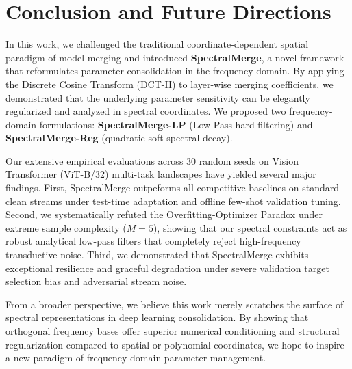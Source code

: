\section{Conclusion and Future Directions}
\label{sec:conclusion}

In this work, we challenged the traditional coordinate-dependent spatial paradigm of model merging and introduced \textbf{SpectralMerge}, a novel framework that reformulates parameter consolidation in the frequency domain. By applying the Discrete Cosine Transform (DCT-II) to layer-wise merging coefficients, we demonstrated that the underlying parameter sensitivity can be elegantly regularized and analyzed in spectral coordinates. We proposed two frequency-domain formulations: \textbf{SpectralMerge-LP} (Low-Pass hard filtering) and \textbf{SpectralMerge-Reg} (quadratic soft spectral decay). 

Our extensive empirical evaluations across 30 random seeds on Vision Transformer (ViT-B/32) multi-task landscapes have yielded several major findings. First, SpectralMerge outpeforms all competitive baselines on standard clean streams under test-time adaptation and offline few-shot validation tuning. Second, we systematically refuted the Overfitting-Optimizer Paradox under extreme sample complexity ($M=5$), showing that our spectral constraints act as robust analytical low-pass filters that completely reject high-frequency transductive noise. Third, we demonstrated that SpectralMerge exhibits exceptional resilience and graceful degradation under severe validation target selection bias and adversarial stream noise.

From a broader perspective, we believe this work merely scratches the surface of spectral representations in deep learning consolidation. By showing that orthogonal frequency bases offer superior numerical conditioning and structural regularization compared to spatial or polynomial coordinates, we hope to inspire a new paradigm of frequency-domain parameter management. 

